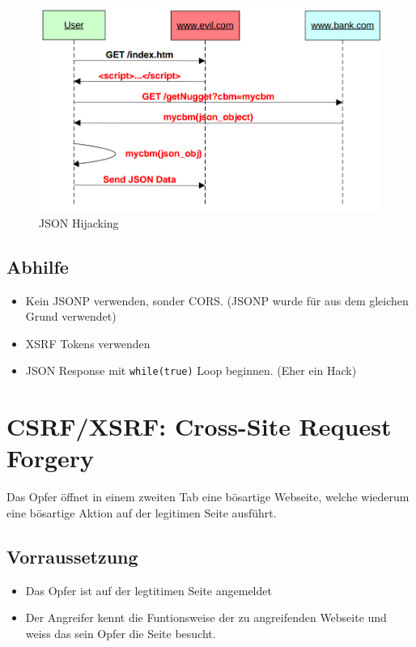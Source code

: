 \begin{figure}[h!]
	\centering
	\includegraphics[width=0.7\linewidth]{images/json_hijacking}
	\caption{JSON Hijacking}
	\label{fig:jsonhijacking}
\end{figure}

\subsection{Abhilfe}
\begin{itemize}
	\item Kein JSONP verwenden, sonder CORS. (JSONP wurde für aus dem gleichen Grund verwendet)
	\item XSRF Tokens verwenden
	\item JSON Response mit \lstinline|while(true)| Loop beginnen. (Eher ein Hack)
\end{itemize}

\section{CSRF/XSRF: Cross-Site Request Forgery}
Das Opfer öffnet in einem zweiten Tab eine bösartige Webseite, welche wiederum eine bösartige Aktion auf der legitimen Seite ausführt. 

\subsection{Vorraussetzung}
\begin{itemize}
	\item Das Opfer ist auf der legtitimen Seite angemeldet
	\item Der Angreifer kennt die Funtionsweise der zu angreifenden Webseite und weiss das sein Opfer die Seite besucht.
\end{itemize}


